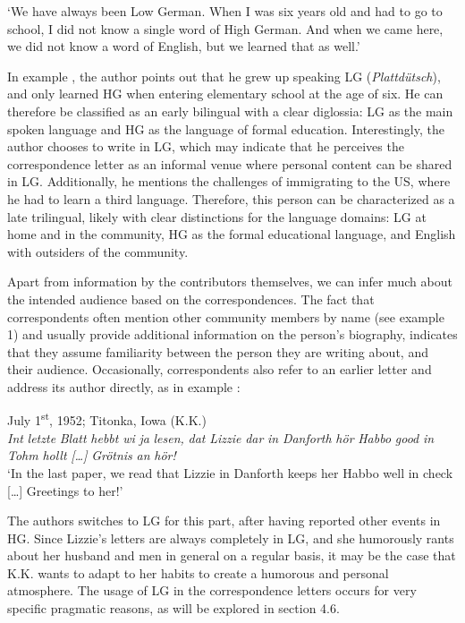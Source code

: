 \documentclass[output=paper]{langsci/langscibook}
\begin{document}
‘We have always been Low German. When I was six years old and had to go to school, I did not know a single word of High German. And when we came here, we did not know a word of English, but we learned that as well.’
\z

In example , the author points out that he grew up speaking LG (\textit{Plattdütsch}), and only learned HG when entering elementary school at the age of six. He can therefore be classified as an early bilingual with a clear diglossia: LG as the main spoken language and HG as the language of formal education. Interestingly, the author chooses to write in LG, which may indicate that he perceives the correspondence letter as an informal venue where personal content can be shared in LG. Additionally, he mentions the challenges of immigrating to the US, where he had to learn a third language. Therefore, this person can be characterized as a late trilingual, likely with clear distinctions for the language domains: LG at home and in the community, HG as the formal educational language, and English with outsiders of the community. 

Apart from information by the contributors themselves, we can infer much about the intended audience based on the correspondences. The fact that correspondents often mention other community members by name (see example 1) and usually provide additional information on the person’s biography, indicates that they assume familiarity between the person they are writing about, and their audience. Occasionally, correspondents also refer to an earlier letter and address its author directly, as in example :

\ea
\label{ex:rocker:3}
July 1\textsuperscript{st}, 1952; Titonka, Iowa (K.K.)\\

\textit{Int} \textit{letzte} \textit{Blatt} \textit{hebbt} \textit{wi} \textit{ja} \textit{lesen,} \textit{dat} \textit{Lizzie} \textit{dar} \textit{in} \textit{Danforth} \textit{hör} \textit{Habbo} \textit{good} \textit{in} \textit{Tohm}  \textit{hollt} \textit{[…]} \textit{Grötnis} \textit{an} \textit{hör!}\\

‘In the last paper, we read that Lizzie in Danforth keeps her Habbo well in check […] Greetings to her!’
\z

The authors switches to LG for this part, after having reported other events in HG. Since Lizzie’s letters are always completely in LG, and she humorously rants about her husband and men in general on a regular basis, it may be the case that K.K. wants to adapt to her habits to create a humorous and personal atmosphere. The usage of LG in the correspondence letters occurs for very specific pragmatic reasons, as will be explored in section 4.6. 
\end{document}
